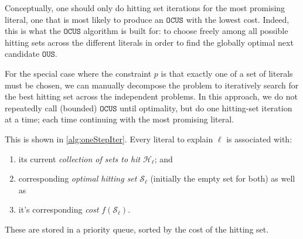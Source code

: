 \documentclass[a4paper,UKenglish,cleveref, autoref, thm-restate, pdfa]{lipics-v2021}
\newcommand\m[1]{\mathcal{#1}}
\renewcommand\comment[1]{}
\newcommand{\emilio}[1]{{\comment{\color{red}Emilio: #1}}}
\newcommand{\bart}[1]{{\comment{\color{OliveGreen}Bart: #1}}}
\newcommand\setstohit{\ensuremath{\m{H} }\xspace}
\newcommand\mm[1]{\ensuremath{#1}\xspace}
\newcommand\call[1]{\mm{\texttt{#1}}}
\newcommand\ohs{\mm{\call{OptHittingSet}}}
\newcommand\omus{\mm{\call{OUS}}}
\newcommand\comus{\mm{\call{OCUS}}}
\newcommand\ousb{\mm{\call{OCUS\_Bounded}}}
\newcommand\iterativeonestep{\ensuremath{\call{Explain-One-Step-OCUS-Split}}\xspace}
\begin{document}
Conceptually, one should only do hitting set iterations for the most promising literal, one that is most likely to produce an \comus with the lowest cost. 
Indeed, this is what the \comus algorithm is built for: to choose freely among all possible hitting sets across the different literals in order to find the globally optimal next candidate \omus. 

For the special case where the constraint $p$ is that exactly one of a set of literals must be chosen, we can manually decompose the problem to iteratively search for the best hitting set across the independent problems.
In this approach, we do not repeatedly call (bounded) \comus until optimality, but do one hitting-set iteration at a time; each time continuing with the most promising literal. 

This is shown in \cref{alg:oneStepIter}. Every literal to explain $\ell$ is associated with:
\begin{enumerate}
	\item its current \emph{collection of sets to hit} ${\setstohit_{\ell}}$; and
	\item corresponding \emph{optimal hitting set} ${\m{S}_\ell}$ (initially the empty set for both) as well as
	\item it's corresponding \emph{cost} ${f(\m{S}_\ell)}$.
\end{enumerate}
These are stored in a priority queue, sorted by the cost of the hitting set. 
\end{document}
